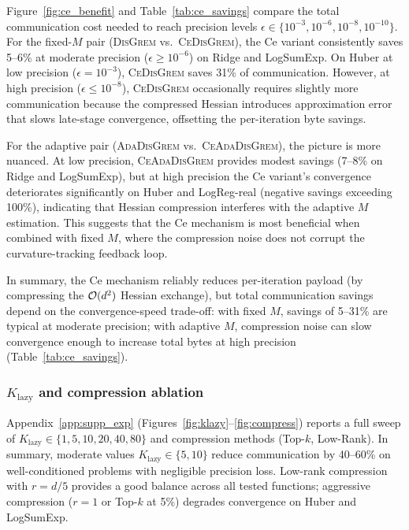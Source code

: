 \documentclass[review,onefignum,onetabnum]{siamart171218}
\begin{document}
	Figure~\ref{fig:ce_benefit} and Table~\ref{tab:ce_savings} compare
	the total communication cost needed to reach precision levels $\epsilon\in\{10^{-3},10^{-6},10^{-8},10^{-10}\}$.
	For the fixed-$M$ pair (\textsc{DisGrem} vs.\ \textsc{CeDisGrem}), the Ce variant
	consistently saves 5--6\% at moderate precision ($\epsilon \ge 10^{-6}$)
	on Ridge and LogSumExp.
	On Huber at low precision ($\epsilon{=}10^{-3}$), \textsc{CeDisGrem} saves
	31\% of communication.
	However, at high precision ($\epsilon \le 10^{-8}$), \textsc{CeDisGrem}
	occasionally requires slightly more communication because the
	compressed Hessian introduces approximation error that slows late-stage
	convergence, offsetting the per-iteration byte savings.
	
	For the adaptive pair (\textsc{AdaDisGrem} vs.\ \textsc{CeAdaDisGrem}), the picture is
	more nuanced.
	At low precision, \textsc{CeAdaDisGrem} provides modest savings (7--8\% on
	Ridge and LogSumExp), but at high precision the Ce variant's
	convergence deteriorates significantly on Huber and LogReg-real
	(negative savings exceeding 100\%), indicating that Hessian
	compression interferes with the adaptive $M$ estimation.
	This suggests that the Ce mechanism is most beneficial when combined
	with fixed $M$, where the compression noise does not corrupt the
	curvature-tracking feedback loop.

	In summary, the Ce mechanism reliably reduces
	per-iteration payload (by compressing the $\mathcal{O}(d^2)$
	Hessian exchange), but total communication savings depend on
	the convergence-speed trade-off: with fixed $M$, savings of
	5--31\% are typical at moderate precision; with adaptive $M$,
	compression noise can slow convergence enough to increase
	total bytes at high precision (Table~\ref{tab:ce_savings}).

	\subsubsection{$K_{\mathrm{lazy}}$ and compression ablation}

	Appendix~\ref{app:supp_exp} (Figures~\ref{fig:klazy}--\ref{fig:compress})
	reports a full sweep of $K_{\mathrm{lazy}}\in\{1,5,10,20,40,80\}$
	and compression methods (Top-$k$, Low-Rank).
	In summary, moderate values $K_{\mathrm{lazy}}\in\{5,10\}$ reduce
	communication by 40--60\% on well-conditioned problems with
	negligible precision loss.
	Low-rank compression with $r{=}d/5$ provides a good balance
	across all tested functions; aggressive compression ($r{=}1$ or
	Top-$k$ at 5\%) degrades convergence on Huber and LogSumExp.
	
\end{document}
